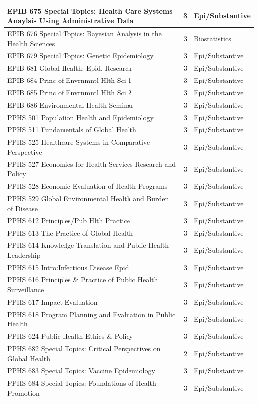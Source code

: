 \documentclass[
]{book}
\begin{document}
\begin{table}
\begin{tabular}[t]{l|r|l}
\hline
EPIB 675 Special Topics: Health Care Systems Anaylsis Using Administrative Data & 3 & Epi/Substantive\\
\hline
EPIB 676 Special Topics: Bayesian Analysis in the Health Sciences & 3 & Biostatistics\\
\hline
EPIB 679 Special Topics: Genetic Epidemiology & 3 & Epi/Substantive\\
\hline
EPIB 681 Global Health: Epid. Research & 3 & Epi/Substantive\\
\hline
EPIB 684 Princ of Envrnmntl Hlth Sci 1 & 3 & Epi/Substantive\\
\hline
EPIB 685 Princ of Envrnmntl Hlth Sci 2 & 3 & Epi/Substantive\\
\hline
EPIB 686 Environmental Health Seminar & 3 & Epi/Substantive\\
\hline
PPHS 501 Population Health and Epidemiology & 3 & Epi/Substantive\\
\hline
PPHS 511 Fundamentals of Global Health & 3 & Epi/Substantive\\
\hline
PPHS 525 Healthcare Systems in Comparative Perspective & 3 & Epi/Substantive\\
\hline
PPHS 527 Economics for Health Services Research and Policy & 3 & Epi/Substantive\\
\hline
PPHS 528 Economic Evaluation of Health Programs & 3 & Epi/Substantive\\
\hline
PPHS 529 Global Environmental Health and Burden of Disease & 3 & Epi/Substantive\\
\hline
PPHS 612 Principles/Pub Hlth Practice & 3 & Epi/Substantive\\
\hline
PPHS 613 The Practice of Global Health & 3 & Epi/Substantive\\
\hline
PPHS 614 Knowledge Translation and Public Health Leadership & 3 & Epi/Substantive\\
\hline
PPHS 615 Intro:Infectious Disease Epid & 3 & Epi/Substantive\\
\hline
PPHS 616 Principles \& Practice of Public Health Surveillance & 3 & Epi/Substantive\\
\hline
PPHS 617 Impact Evaluation & 3 & Epi/Substantive\\
\hline
PPHS 618 Program Planning and Evaluation in Public Health & 3 & Epi/Substantive\\
\hline
PPHS 624 Public Health Ethics \& Policy & 3 & Epi/Substantive\\
\hline
PPHS 682 Special Topics: Critical Perspectives on Global Health & 2 & Epi/Substantive\\
\hline
PPHS 683 Special Topics: Vaccine Epidemiology & 3 & Epi/Substantive\\
\hline
PPHS 684 Special Topics: Foundations of Health Promotion & 3 & Epi/Substantive\\
\hline
\end{tabular}
\end{table}
\end{document}

